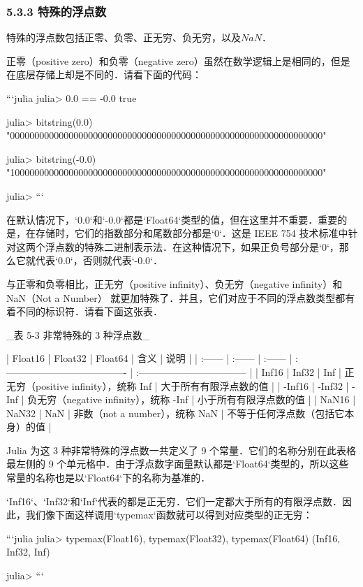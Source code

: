 \subsubsection{5.3.3 特殊的浮点数}

特殊的浮点数包括正零、负零、正无穷、负无穷，以及$NaN$．

正零（positive zero）和负零（negative zero）虽然在数学逻辑上是相同的，但是在底层存储上却是不同的．请看下面的代码：

```julia
julia> 0.0 == -0.0 
true

julia> bitstring(0.0)
"0000000000000000000000000000000000000000000000000000000000000000"

julia> bitstring(-0.0)
"1000000000000000000000000000000000000000000000000000000000000000"

julia> 
```

在默认情况下，`0.0`和`-0.0`都是`Float64`类型的值，但在这里并不重要．重要的是，在存储时，它们的指数部分和尾数部分都是`0`．这是 IEEE 754 技术标准中针对这两个浮点数的特殊二进制表示法．在这种情况下，如果正负号部分是`0`，那么它就代表`0.0`，否则就代表`-0.0`．

与正零和负零相比，正无穷（positive infinity）、负无穷（negative infinity）和 NaN（Not a Number） 就更加特殊了．并且，它们对应于不同的浮点数类型都有着不同的标识符．请看下面这张表．

_表 5-3 非常特殊的 3 种浮点数_

| Float16 | Float32 | Float64 | 含义                                   | 说明                               |
| :------ | :------ | :------ | :------------------------------------- | :--------------------------------- |
| Inf16   | Inf32   | Inf     | 正无穷（positive infinity），统称 Inf  | 大于所有有限浮点数的值             |
| -Inf16  | -Inf32  | -Inf    | 负无穷（negative infinity），统称 -Inf | 小于所有有限浮点数的值             |
| NaN16   | NaN32   | NaN     | 非数（not a number），统称 NaN         | 不等于任何浮点数（包括它本身）的值 |

Julia 为这 3 种非常特殊的浮点数一共定义了 9 个常量．它们的名称分别在此表格最左侧的 9 个单元格中．由于浮点数字面量默认都是`Float64`类型的，所以这些常量的名称也是以`Float64`下的名称为基准的．

`Inf16`、`Inf32`和`Inf`代表的都是正无穷．它们一定都大于所有的有限浮点数．因此，我们像下面这样调用`typemax`函数就可以得到对应类型的正无穷：

```julia
julia> typemax(Float16), typemax(Float32), typemax(Float64)
(Inf16, Inf32, Inf)

julia> 
```


